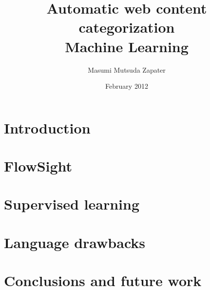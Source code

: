 \documentclass[12pt, a4paper , titlepage]{report}
\author{Masumi Mutsuda Zapater}
\title{Automatic web content categorization \\ Machine Learning}
\date{February 2012}
\begin{document}
\maketitle



\tableofcontents


\chapter{Introduction}


\chapter{FlowSight}


\chapter{Supervised learning}


\chapter{Language drawbacks}


\chapter{Conclusions and future work}
%


\end{document}
